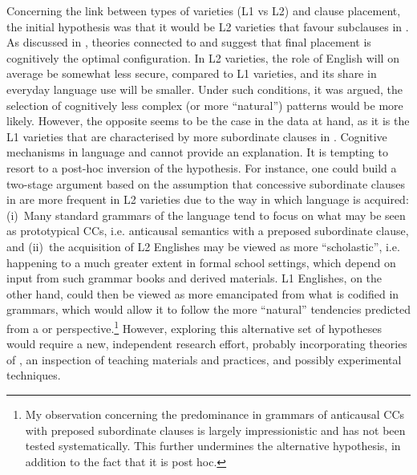 Concerning the link between types of varieties (L1 vs L2) and clause placement, the initial hypothesis was that it would be L2 varieties that favour subclauses in . As discussed in , theories connected to  and  suggest that final placement is cognitively the optimal configuration. In L2 varieties, the role of English will on average be somewhat less secure, compared to L1 varieties, and its share in everyday language use will be smaller. Under such conditions, it was argued, the selection of cognitively less complex (or more “natural”) patterns would be more likely. However, the opposite seems to be the case in the data at hand, as it is the L1 varieties that are characterised by more subordinate clauses in . Cognitive mechanisms in language  and  cannot provide an explanation. It is tempting to resort to a post-hoc inversion of the hypothesis. For instance, one could build a two-stage argument based on the assumption that concessive subordinate clauses in  are more frequent in L2 varieties due to the way in which language is acquired:
(i)~Many standard grammars of the language tend to focus on what may be seen as prototypical CCs, i.e. anticausal semantics with a preposed subordinate clause, and
(ii)~the acquisition of L2 Englishes may be viewed as more “scholastic”, i.e. happening  to a much greater extent in formal school settings, which depend on input from such grammar books and derived materials. L1 Englishes, on the other hand, could then be viewed as more emancipated from what is codified in grammars, which would allow it to follow the more “natural” tendencies predicted from a  or  perspective.\footnote{My observation concerning the predominance in grammars of anticausal CCs with preposed subordinate clauses is largely impressionistic and has not been tested systematically. This further undermines the alternative hypothesis, in addition to the fact that it is post hoc.} However, exploring this alternative set of hypotheses would require a new, independent research effort, probably incorporating theories of , an inspection of teaching materials and practices, and possibly experimental techniques.

